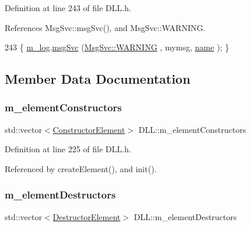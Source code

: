 Definition at line 243 of file D\+L\+L.\+h.



References Msg\+Svc\+::msg\+Svc(), and Msg\+Svc\+::\+W\+A\+R\+N\+I\+NG.


\begin{DoxyCode}
243 \{ \hyperlink{classDLL_a6e66cd993e2d142b48691557ce8e4047}{m\_log}.\hyperlink{classMsgSvc_ad25f18047920cc59a314e5098259711c}{msgSvc} (\hyperlink{classMsgSvc_ae671eb7301996cd049d2da8a65925926a7cefae88f2ba26b2b05b676a383c834b}{MsgSvc::WARNING} , mymsg, \hyperlink{classDLL_a0a915d538771dde2cb0580cd340ee088}{name} ); \}
\end{DoxyCode}


\subsection{Member Data Documentation}
\mbox{\label{classDLL_a7ee65d305f4f6014f6499d69f162d024}} 
\subsubsection{\texorpdfstring{m\+\_\+element\+Constructors}{m\_elementConstructors}}
{\footnotesize\ttfamily std\+::vector$<$\hyperlink{classDLL_a104a81e667f9a54504c0faf095f77fc7}{Constructor\+Element}$>$ D\+L\+L\+::m\+\_\+element\+Constructors\hspace{0.3cm}{\ttfamily [private]}}



Definition at line 225 of file D\+L\+L.\+h.



Referenced by create\+Element(), and init().

\mbox{\label{classDLL_a5004587b4dac5d0ccb0ab99b167ef159}} 
\subsubsection{\texorpdfstring{m\+\_\+element\+Destructors}{m\_elementDestructors}}
{\footnotesize\ttfamily std\+::vector$<$\hyperlink{classDLL_a204f0c776712969410a2673db3d98cf5}{Destructor\+Element}$>$ D\+L\+L\+::m\+\_\+element\+Destructors\hspace{0.3cm}{\ttfamily [private]}}



